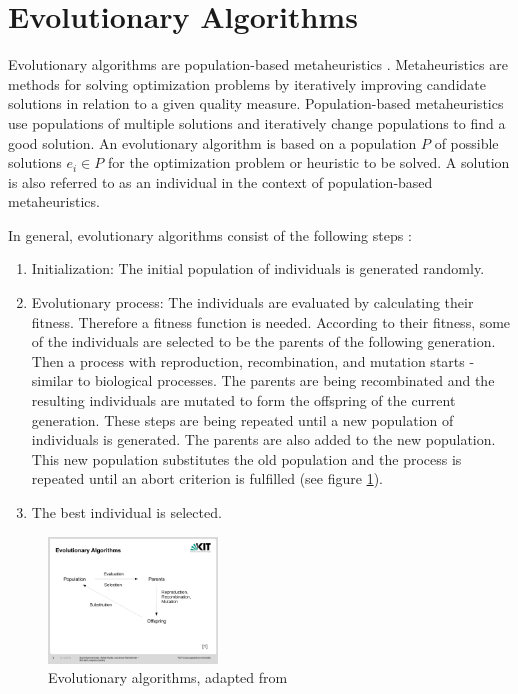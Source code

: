 \section{Evolutionary Algorithms} \label{sec:EA}

Evolutionary algorithms are population-based metaheuristics \cite{EA}. Metaheuristics are methods for solving optimization problems by iteratively improving candidate solutions in relation to a given quality measure.
Population-based metaheuristics use populations of multiple solutions and iteratively change populations to find a good solution.
An evolutionary algorithm is based on a population $P$ of possible solutions $e_i \in P$ for the optimization problem or heuristic to be solved. A solution is also referred to as an individual in the context of population-based metaheuristics.

In general, evolutionary algorithms consist of the following steps \cite{EA}:

\begin{enumerate}
\item Initialization: The initial population of individuals is generated randomly.

\item Evolutionary process: The individuals are evaluated by calculating their fitness. Therefore a fitness function is needed.
According to their fitness, some of the individuals are selected to be the parents of the following generation.
Then a process with reproduction, recombination, and mutation starts - similar to biological processes.
The parents are being recombinated and the resulting individuals are mutated to form the offspring of the current generation.
These steps are being repeated until a new population of individuals is generated. The parents are also added to the new population. This new population substitutes the old population and the process is repeated until an abort criterion is fulfilled  (see figure \ref{fig:EA}).

\item The best individual is selected.
\end{enumerate}


\begin{figure}
	\begin{center}
		\includegraphics[trim = 2.2cm 6cm 4.1cm 6cm, clip, width=0.4\textwidth]{EA}
	\end{center}
	\caption{Evolutionary algorithms, adapted from \cite{EA}}
	\label{fig:EA}
\end{figure}

